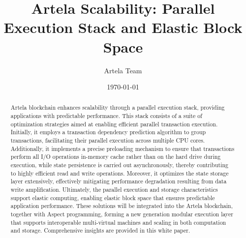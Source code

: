 \documentclass[twocolumn]{article}
\begin{document}
\small

\title{Artela Scalability: Parallel Execution Stack and Elastic Block Space}
\author{Artela Team}
\date{\today}


\maketitle

\begin{abstract}
    Artela blockchain enhances scalability through a parallel execution stack, providing applications with predictable performance. This stack consists of a suite of optimization strategies aimed at enabling efficient parallel transaction execution. Initially, it employs a transaction dependency prediction algorithm to group transactions, facilitating their parallel execution across multiple CPU cores. Additionally, it implements a precise preloading mechanism to ensure that transactions perform all I/O operations in-memory cache rather than on the hard drive during execution, while state persistence is carried out asynchronously, thereby contributing to highly efficient read and write operations. Moreover, it optimizes the state storage layer extensively, effectively mitigating performance degradation resulting from data write amplification. Ultimately, the parallel execution and storage characteristics support elastic computing, enabling elastic block space that ensures predictable application performance. These solutions will be integrated into the Artela blockchain, together with Aspect\cite{artela_aspect_whitepaper} programming, forming a new generation modular execution layer that supports interoperable multi-virtual machines and scaling in both computation and storage. Comprehensive insights are provided in this white paper.
\end{abstract}











 
\end{document}
